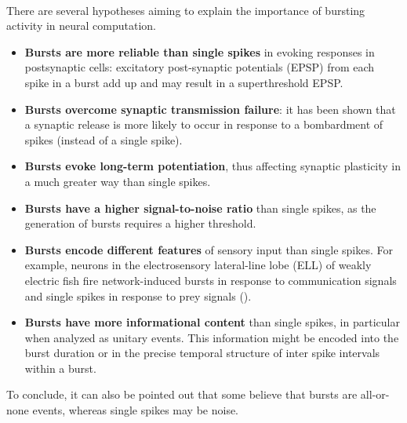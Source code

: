 \paragraph{}
There are several hypotheses aiming to explain the importance of bursting activity in
neural computation.
\begin{itemize}
    \item \textbf{Bursts are more reliable than single spikes} in evoking responses in
          postsynaptic cells: excitatory post-synaptic potentials (EPSP) from each spike in
          a burst add up and may result in a superthreshold EPSP.
    \item \textbf{Bursts overcome synaptic transmission failure}: it has been shown
          that a synaptic release is more likely to occur in response to a bombardment
          of spikes (instead of a single spike).
    \item \textbf{Bursts evoke long-term potentiation}, thus affecting synaptic
          plasticity in a much greater way than single spikes.
    \item \textbf{Bursts have a higher signal-to-noise ratio} than single spikes, as
          the generation of bursts requires a higher threshold.
    \item \textbf{Bursts encode different features} of sensory input than single
          spikes. For example, neurons in the electrosensory lateral-line lobe (ELL) of
          weakly electric fish fire network-induced bursts in response to communication
          signals and single spikes in response to prey signals ().
    \item \textbf{Bursts have more informational content} than single spikes, in
          particular when analyzed as unitary events. This information might be encoded
          into the burst duration or in the precise temporal structure of inter spike
          intervals within a burst.
\end{itemize}
To conclude, it can also be pointed out that some believe that bursts are all-or-none events,
whereas single spikes may be noise.
